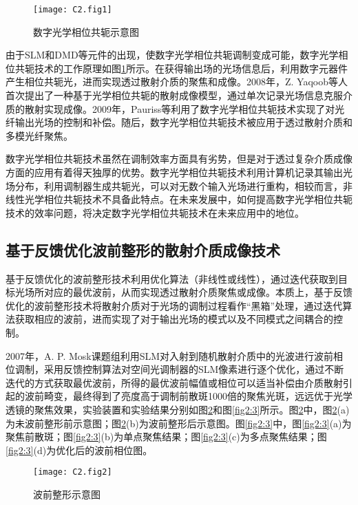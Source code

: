 \begin{figure}[htp]
	\centering
	\texttt{[image: C2.fig1]}
	\caption{数字光学相位共轭示意图}
	\label{fig2:1}
\end{figure}

由于SLM和DMD等元件的出现，使数字光学相位共轭调制变成可能，数字光学相位共轭技术的工作原理如图\ref{fig2:1}所示。在获得输出场的光场信息后，利用数字元器件产生相位共轭光，进而实现透过散射介质的聚焦和成像。2008年，Z. Yaqoob等\cite{yaqoob_optical_2008}人首次提出了一种基于光学相位共轭的散射成像模型，通过单次记录光场信息克服介质的散射实现成像。2009年，Pauriss等\cite{paurisse_phase_2009}利用了数字光学相位共轭技术实现了对光纤输出光场的控制和补偿。随后，数字光学相位共轭技术被应用于透过散射介质和多模光纤聚焦\cite{cui_implementation_2010,lhermite_coherent_2010}。

数字光学相位共轭技术虽然在调制效率方面具有劣势，但是对于透过复杂介质成像方面的应用有着得天独厚的优势。数字光学相位共轭技术利用计算机记录其输出光场分布，利用调制器生成共轭光，可以对无数个输入光场进行重构，相较而言，非线性光学相位共轭技术不具备此特点。在未来发展中，如何提高数字光学相位共轭技术的效率问题，将决定数字光学相位共轭技术在未来应用中的地位。

\subsection{基于反馈优化波前整形的散射介质成像技术}

基于反馈优化的波前整形技术利用优化算法（非线性或线性），通过迭代获取到目标光场所对应的最优波前，从而实现透过散射介质聚焦或成像。本质上，基于反馈优化的波前整形技术将散射介质对于光场的调制过程看作“黑箱”处理，通过迭代算法获取相应的波前，进而实现了对于输出光场的模式以及不同模式之间耦合的控制。

2007年，A. P. Mosk\cite{Vellekoop2007}课题组利用SLM对入射到随机散射介质中的光波进行波前相位调制，采用反馈控制算法对空间光调制器的SLM像素进行逐个优化，通过不断迭代的方式获取最优波前，所得的最优波前幅值或相位可以适当补偿由介质散射引起的波前畸变，最终得到了亮度高于调制前散斑1000倍的聚焦光斑，远远优于光学透镜的聚焦效果，实验装置和实验结果分别如图\ref{fig2:2}和图\ref{fig2:3}所示\cite{Vellekoop2007}。图\ref{fig2:2}中，图\ref{fig2:2}(a)为未波前整形前示意图；图\ref{fig2:2}(b)为波前整形后示意图。图\ref{fig2:3}中，图\ref{fig2:3}(a)为聚焦前散斑；图\ref{fig2:3}(b)为单点聚焦结果；图\ref{fig2:3}(c)为多点聚焦结果；图\ref{fig2:3}(d)为优化后的波前相位图。

\begin{figure}[htp]
	\centering
	\texttt{[image: C2.fig2]}
	\caption{波前整形示意图}
	\label{fig2:2}
\end{figure}

